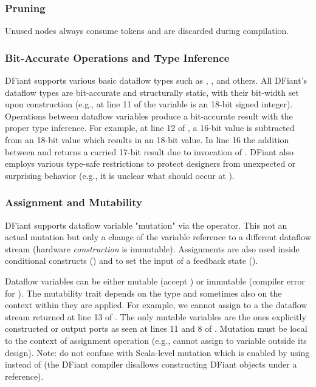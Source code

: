 \subsubsection{Pruning}
Unused nodes always consume tokens and are discarded during compilation. 

\subsubsection{Bit-Accurate Operations and Type Inference}
DFiant supports various basic dataflow types such as , , and others.
All DFiant's dataflow types are bit-accurate and structurally static, with their bit-width set upon construction (e.g., at line 11 of  the variable  is an 18-bit signed integer). Operations between dataflow variables produce a bit-accurate result with the proper type inference. For example, at line 12 of , a 16-bit value is subtracted from an 18-bit value which results in an 18-bit value. In line 16 the addition between  and  returns a carried 17-bit result due to invocation of . DFiant also employs various type-safe restrictions to protect designers from unexpected or surprising behavior (e.g., it is unclear what should occur at ).

\subsubsection{Assignment and Mutability}
\label{sec:mutability}
DFiant supports dataflow variable "mutation" via the \code{:=} operator. This not an actual mutation but only a change of the variable reference to a different dataflow stream (hardware \emph{construction} is immutable). Assignments are also used inside conditional constructs () and to set the input of a feedback state ().

Dataflow variables can be either mutable (accept \code{:=}) or immutable (compiler error for \code{:=}). The mutability trait depends on the type and sometimes also on the context within they are applied. For example, we cannot assign to a the dataflow stream returned at line 13 of . The only mutable variables are the ones explicitly constructed or output ports as seen at lines 11 and 8 of . Mutation must be local to the context of assignment operation (e.g., cannot assign to variable outside its design).
Note: do not confuse with Scala-level mutation which is enabled by using  instead of  (the DFiant compiler disallows constructing DFiant objects under a  reference). 

